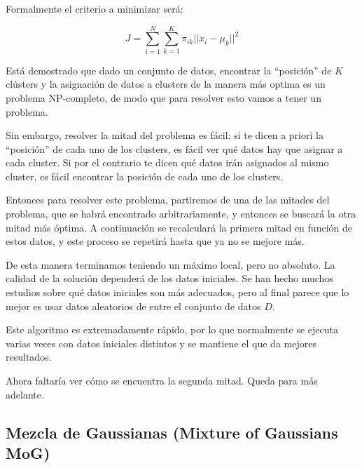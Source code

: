 \documentclass[a4paper,10pt]{article}
\begin{document}
Formalmente el criterio a minimizar será:

\begin{equation*}
J = \sum_{i = 1}^{N} \sum_{k = 1}^{K} \pi_{ik} ||x_i - \mu_k||^2
\end{equation*}

Está demostrado que dado un conjunto de datos, encontrar la ``posición'' de $K$ clústers y la asignación de datos a clusters de la manera más optima es un problema NP-completo, de modo que para resolver esto vamos a tener un problema.

Sin embargo, resolver la mitad del problema es fácil: si te dicen a priori la ``posición'' de cada uno de los clusters, es fácil ver qué datos hay que asignar a cada cluster. Si por el contrario te dicen qué datos irán asignados al mismo cluster, es fácil encontrar la posición de cada uno de los clusters.

Entonces para resolver este problema, partiremos de una de las mitades del problema, que se habrá encontrado arbitrariamente, y entonces se buscará la otra mitad más óptima. A continuación se recalculará la primera mitad en función de estos datos, y este proceso se repetirá hasta que ya no se mejore más.

De esta manera terminamos teniendo un máximo local, pero no absoluto. La calidad de la solución dependerá de los datos iniciales. Se han hecho muchos estudios sobre qué datos iniciales son más adecuados, pero al final parece que lo mejor es usar datos aleatorios de entre el conjunto de datos $D$.

Este algoritmo es extremadamente rápido, por lo que normalmente se ejecuta varias veces con datos iniciales distintos y se mantiene el que da mejores resultados.


Ahora faltaría ver cómo se encuentra la segunda mitad. Queda para más adelante.

\subsection{Mezcla de Gaussianas (Mixture of Gaussians MoG)}
\end{document}
